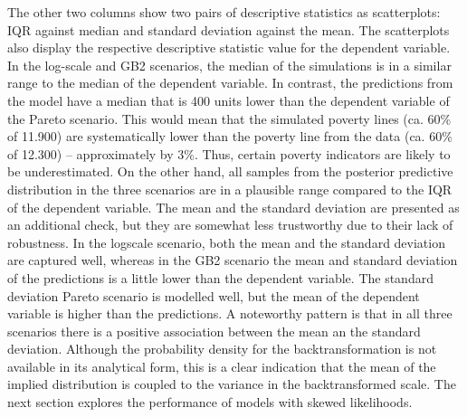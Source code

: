 The other two columns show two pairs of descriptive statistics as scatterplots: IQR against median and standard deviation against the mean.
The scatterplots also display the respective descriptive statistic value for the dependent variable.
In the log-scale and GB2 scenarios, the median of the simulations is in a similar range to the median of the dependent variable.
In contrast, the predictions from the model have a median that is 400 units lower than the dependent variable of the Pareto scenario.
This would mean that the simulated poverty lines (ca. 60\% of 11.900) are systematically lower than the poverty line from the data (ca. 60\% of 12.300) – approximately by 3\%.
Thus, certain poverty indicators are likely to be underestimated.
On the other hand, all samples from the posterior predictive distribution in the three scenarios are in a plausible range compared to the IQR of the dependent variable.
The mean and the standard deviation are presented as an additional check, but they are somewhat less trustworthy due to their lack of robustness.
In the logscale scenario, both the mean and the standard deviation are captured well, whereas in the GB2 scenario the mean and standard deviation of the predictions is a little lower than the dependent variable.
The standard deviation Pareto scenario is modelled well, but the mean of the dependent variable is higher than the predictions.
A noteworthy pattern is that in all three scenarios there is a positive association between the mean an the standard deviation.
Although the probability density for the backtransformation is not available in its analytical form, this is a clear indication that the mean of the implied distribution is coupled to the variance in the backtransformed scale.
The next section explores the performance of models with skewed likelihoods.

